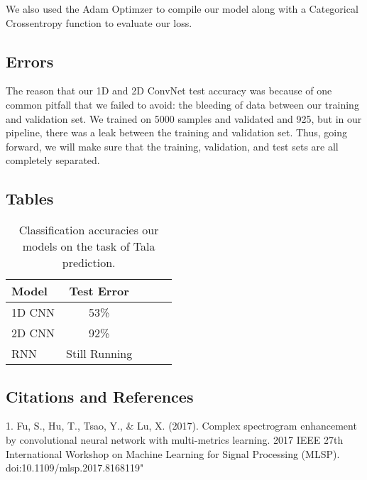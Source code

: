 \documentclass{article}
\begin{document}
We also used the Adam Optimzer to compile our model along with a Categorical Crossentropy function to evaluate our loss. 

 \subsection{Errors}
 The reason that our 1D and 2D ConvNet test accuracy was because of one common pitfall that we failed to avoid: the bleeding of data between our training and validation set. We trained on 5000 samples and validated and 925, but in our pipeline, there was a leak between the training and validation set. Thus, going forward, we will make sure that the training, validation, and test sets are all completely separated.
\subsection{Tables} 

\begin{table}[t]
\caption{Classification accuracies our models on the task of Tala prediction.}
\label{sample-table}
\vskip 0.15in
\begin{center}
\begin{small}
\begin{sc}
\begin{tabular}{lcccr}
\hline
\abovespace\belowspace
Model & Test Error \\
\hline
\abovespace
1D CNN    & 53\% \\
2D CNN & 92\%\\
RNN    & Still Running \\
\hline
\end{tabular}
\end{sc}
\end{small}
\end{center}
\vskip -0.1in
\end{table}
 
\subsection{Citations and References} 

1. Fu, S., Hu, T., Tsao, Y., \& Lu, X. (2017). Complex spectrogram enhancement by convolutional neural network with multi-metrics learning. 2017 IEEE 27th International Workshop on Machine Learning for Signal Processing (MLSP). doi:10.1109/mlsp.2017.8168119"
\end{document}
